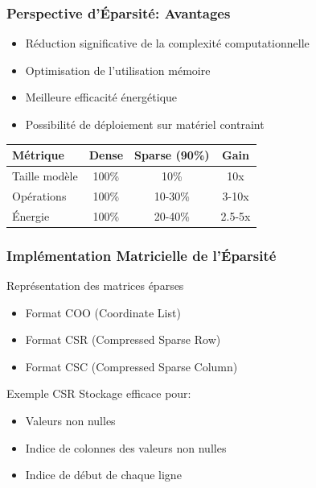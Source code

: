 \documentclass[10pt]{beamer}
\begin{document}
\begin{frame}
\frametitle{Perspective d'Éparsité: Avantages}
\begin{itemize}
    \item Réduction significative de la complexité computationnelle
    \item Optimisation de l'utilisation mémoire
    \item Meilleure efficacité énergétique
    \item Possibilité de déploiement sur matériel contraint
\end{itemize}

\begin{center}
\begin{tabular}{lccc}
\toprule
\textbf{Métrique} & \textbf{Dense} & \textbf{Sparse (90\%)} & \textbf{Gain} \\
\midrule
Taille modèle & 100\% & 10\% & 10x \\
Opérations & 100\% & 10-30\% & 3-10x \\
Énergie & 100\% & 20-40\% & 2.5-5x \\
\bottomrule
\end{tabular}
\end{center}
\end{frame}

\begin{frame}
\frametitle{Implémentation Matricielle de l'Éparsité}
\begin{block}{Représentation des matrices éparses}
\begin{itemize}
    \item Format COO (Coordinate List)
    \item Format CSR (Compressed Sparse Row)
    \item Format CSC (Compressed Sparse Column)
\end{itemize}
\end{block}

\begin{exampleblock}{Exemple CSR}
Stockage efficace pour:
\begin{itemize}
    \item Valeurs non nulles
    \item Indice de colonnes des valeurs non nulles
    \item Indice de début de chaque ligne
\end{itemize}
\end{exampleblock}
\end{frame}
\end{document}
